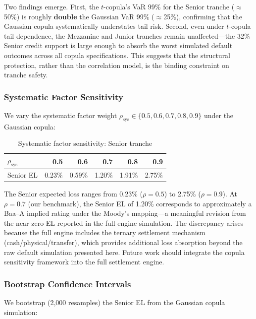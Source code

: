 \documentclass[12pt,a4paper]{article}
\begin{document}
Two findings emerge.
First, the $t$-copula's VaR 99\% for the Senior tranche ($\approx$50\%) is roughly \textbf{double} the Gaussian VaR 99\% ($\approx$25\%), confirming that the Gaussian copula systematically understates tail risk.
Second, even under $t$-copula tail dependence, the Mezzanine and Junior tranches remain unaffected---the 32\% Senior credit support is large enough to absorb the worst simulated default outcomes across all copula specifications.
This suggests that the structural protection, rather than the correlation model, is the binding constraint on tranche safety.

\subsubsection{Systematic Factor Sensitivity}

We vary the systematic factor weight $\rho_{\text{sys}} \in \{0.5, 0.6, 0.7, 0.8, 0.9\}$ under the Gaussian copula:

\begin{table}[H]
\centering
\caption{Systematic factor sensitivity: Senior tranche}
\label{tab:rho-sensitivity}
\begin{tabular}{@{}lrrrrr@{}}
\toprule
$\rho_{\text{sys}}$ & 0.5 & 0.6 & 0.7 & 0.8 & 0.9 \\
\midrule
Senior EL & 0.23\% & 0.59\% & 1.20\% & 1.91\% & 2.75\% \\
\bottomrule
\end{tabular}
\end{table}

The Senior expected loss ranges from 0.23\% ($\rho=0.5$) to 2.75\% ($\rho=0.9$).
At $\rho=0.7$ (our benchmark), the Senior EL of 1.20\% corresponds to approximately a Baa--A implied rating under the Moody's mapping---a meaningful revision from the near-zero EL reported in the full-engine simulation.
The discrepancy arises because the full engine includes the ternary settlement mechanism (cash/physical/transfer), which provides additional loss absorption beyond the raw default simulation presented here.
Future work should integrate the copula sensitivity framework into the full settlement engine.

\subsubsection{Bootstrap Confidence Intervals}

We bootstrap (2,000 resamples) the Senior EL from the Gaussian copula simulation:
\end{document}
